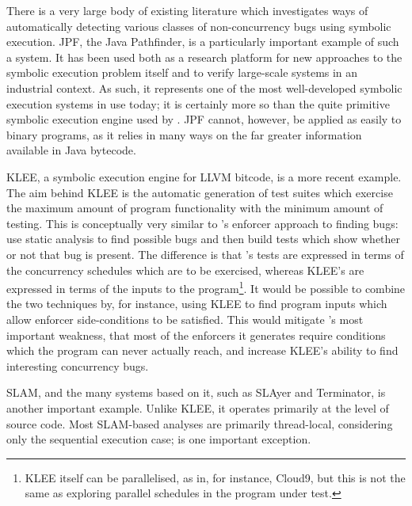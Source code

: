 There is a very large body of existing literature which investigates
ways of automatically detecting various classes of non-concurrency
bugs using symbolic execution.  JPF, the Java
Pathfinder\cite{Havelund2000}, is a particularly important example of
such a system.  It has been used both as a research platform for new
approaches to the symbolic execution problem
itself\cite{D'Amorim2008,Gligoric2010} and to verify large-scale
systems in an industrial context\cite{PCZsCZreanu2008}.  As such, it
represents one of the most well-developed symbolic execution systems
in use today; it is certainly more so than the quite primitive
symbolic execution engine used by {\implementation}.  JPF cannot,
however, be applied as easily to binary programs, as it relies in many
ways on the far greater information available in Java
bytecode\cite{Lindholm2013}.

KLEE\cite{Cadar}, a symbolic execution engine for LLVM
bitcode\cite{Lattner2013}, is a more recent example.  The aim behind
KLEE is the automatic generation of test suites which exercise the
maximum amount of program functionality with the minimum amount of
testing.  This is conceptually very similar to {\technique}'s enforcer
approach to finding bugs: use static analysis to find possible bugs
and then build tests which show whether or not that bug is present.
The difference is that {\technique}'s tests are expressed in terms of
the concurrency schedules which are to be exercised, whereas KLEE's
are expressed in terms of the inputs to the program\footnote{KLEE
  itself can be parallelised, as in, for instance,
  Cloud9\cite{Ciortea2010}, but this is not the same as exploring
  parallel schedules in the program under test.}.  It would be
possible to combine the two techniques by, for instance, using KLEE to
find program inputs which allow {\technique} enforcer side-conditions
to be satisfied.  This would mitigate {\technique}'s most important
weakness, that most of the enforcers it generates require conditions
which the program can never actually reach, and increase KLEE's
ability to find interesting concurrency bugs.

SLAM\cite{Ball2011}, and the many systems based on it, such as
SLAyer\cite{Berdine2011} and Terminator\cite{Cook2006a}, is another
important example.  Unlike KLEE, it operates primarily at the level of
source code.  Most SLAM-based analyses are primarily thread-local,
considering only the sequential execution case; \cite{Cook2007} is one
important exception.  

